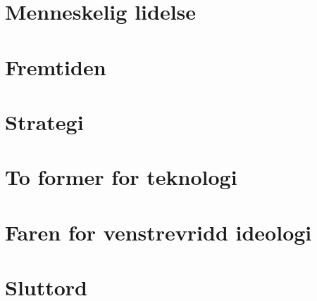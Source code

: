 \documentclass[oneside]{book}
\begin{document}
\chapter{Menneskelig lidelse}

\chapter{Fremtiden}

\chapter{Strategi}

\chapter{To former for teknologi}

\chapter{Faren for venstrevridd ideologi}

\chapter{Sluttord}
\end{document}
